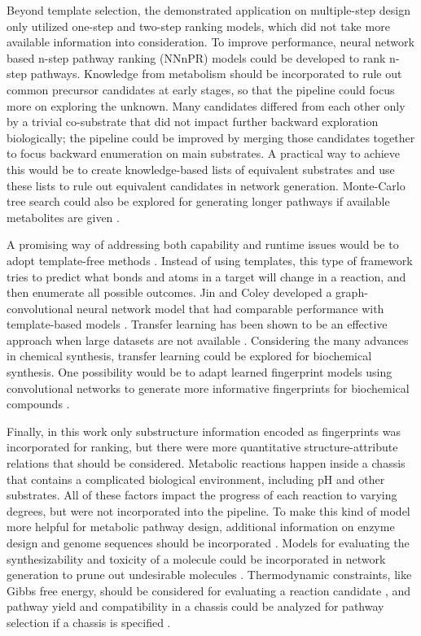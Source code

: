 \documentclass{article}
\begin{document}
Beyond template selection, the demonstrated application on multiple-step design only utilized one-step and two-step ranking models, which did not take more available information into consideration.
To improve performance, neural network based n-step pathway ranking (NNnPR) models could be developed to rank n-step pathways.
Knowledge from metabolism should be incorporated to rule out common precursor candidates at early stages, so that the pipeline could focus more on exploring the unknown.
Many candidates differed from each other only by a trivial co-substrate that did not impact further backward exploration biologically; the pipeline could be improved by merging those candidates together to focus backward enumeration on main substrates.
A practical way to achieve this would be to create knowledge-based lists of equivalent substrates and use these lists to rule out equivalent candidates in network generation.
Monte-Carlo tree search could also be explored for generating longer pathways if available metabolites are given \citep{koch2019reinforcement}.

A promising way of addressing both capability and runtime issues would be to adopt template-free methods \citep{coley2019graph, jin2017predicting}.
Instead of using templates, this type of framework tries to predict what bonds and atoms in a target will change in a reaction, and then enumerate all possible outcomes.
Jin and Coley developed a graph-convolutional neural network model that had comparable performance with template-based models \citep{jin2017predicting}.
Transfer learning has been shown to be an effective approach when large datasets are not available \citep{pan2009survey}.
Considering the many advances in chemical synthesis, transfer learning could be explored for biochemical synthesis.
One possibility would be to adapt learned fingerprint models using convolutional networks to generate more informative fingerprints for biochemical compounds \citep{duvenaud2015convolutional, gomez2018automatic, wei2016neural}.

Finally, in this work only substructure information encoded as fingerprints was incorporated for ranking, but there were more quantitative structure-attribute relations that should be considered.
Metabolic reactions happen inside a chassis that contains a complicated biological environment, including pH and other substrates.
All of these factors impact the progress of each reaction to varying degrees, but were not incorporated into the pipeline.
To make this kind of model more helpful for metabolic pathway design, additional information on enzyme design and genome sequences should be incorporated \citep{keasling2010manufacturing}.
Models for evaluating the synthesizability and toxicity of a molecule could be incorporated in network generation to prune out undesirable molecules \citep{gao2020synthesizability, jang2020structure}.
Thermodynamic constraints, like Gibbs free energy, should be considered for evaluating a reaction candidate \citep{yim2011metabolic}, and pathway yield and compatibility in a chassis could be analyzed for pathway selection if a chassis is specified \citep{delepine2018retropath2}.
\end{document}
